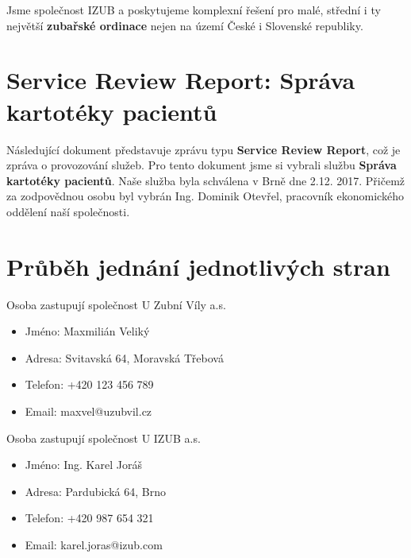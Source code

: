\documentclass[11pt, a4paper, titlepage]{article}
\begin{document}
	
	\pagestyle{fancy}

	\noindent Jsme společnost IZUB a poskytujeme komplexní řešení pro malé, střední i ty největší \textbf{zubařské ordinace} nejen na území České i Slovenské republiky.

	\section*{Service Review Report: Správa kartotéky pacientů}

	\noindent\makebox[\linewidth]{\rule{17.5cm}{0.4pt}}

	\vspace{0.5em}

	\noindent Následující dokument představuje zprávu typu \textbf{Service Review Report}, což je zpráva o provozování služeb. Pro tento dokument jsme si vybrali službu \textbf{Správa kartotéky pacientů}. Naše služba byla schválena v Brně dne 2.12. 2017. Přičemž za zodpovědnou osobu byl vybrán Ing. Dominik Otevřel, pracovník ekonomického oddělení naší společnosti.

	\noindent\makebox[\linewidth]{\rule{17.5cm}{0.4pt}}

	\section{Průběh jednání jednotlivých stran}

	\begin{multicols}{2}

	Osoba zastupují společnost U Zubní Víly a.s.
	\begin{itemize}
		\item Jméno: Maxmilián Veliký
		\item Adresa: Svitavská 64, Moravská Třebová
		\item Telefon: +420 123 456 789
		\item Email: maxvel@uzubvil.cz
	\end{itemize}

	Osoba zastupují společnost U IZUB a.s.
	\begin{itemize}
		\item Jméno: Ing. Karel Joráš
		\item Adresa: Pardubická 64, Brno
		\item Telefon: +420 987 654 321
		\item Email: karel.joras@izub.com
	\end{itemize}

	\end{multicols}
\end{document}
